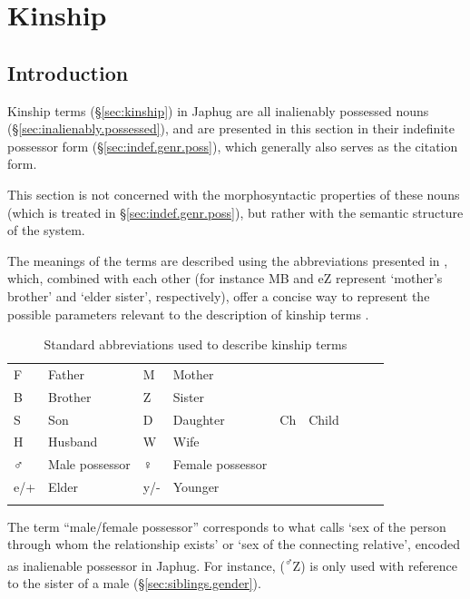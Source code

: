 \chapter{Kinship} \label{chap:kinship}

\section{Introduction}
Kinship terms (§\ref{sec:kinship}) in Japhug are all inalienably possessed nouns (§\ref{sec:inalienably.possessed}), and are presented in this section in their indefinite possessor form (§\ref{sec:indef.genr.poss}), which generally also serves as the citation form.

This section is not concerned with the morphosyntactic properties of these nouns (which is treated in §\ref{sec:indef.genr.poss}), but rather with the semantic structure of the system. 

The meanings of the terms are described using the abbreviations presented in , which, combined with each other (for instance MB and  eZ represent `mother's brother' and  `elder sister', respectively), offer a concise way to represent the possible parameters relevant to the description of kinship terms \citep{kroeber1909classificatory}. 

 
\begin{table}
\caption{Standard abbreviations used to describe kinship terms} \label{tab:kinship.abb}
\begin{tabular}{llXllXlll}
\lsptoprule
F & Father & M & Mother \\
B & Brother & Z & Sister \\
S & Son & D & Daughter & Ch & Child \\
H & Husband & W & Wife \\
♂  & Male possessor & ♀& Female possessor \\
e/+ & Elder & y/- & Younger \\
\lspbottomrule
\end{tabular}
\end{table}

The term ``male/female possessor'' corresponds to what \citet[78--79]{kroeber1909classificatory} calls `sex of the person through whom the relationship exists' or `sex of the connecting relative', encoded as inalienable possessor in Japhug. For instance,  (\textsuperscript{♂}Z) is only used with reference to the sister of a male (§\ref{sec:siblings.gender}).

